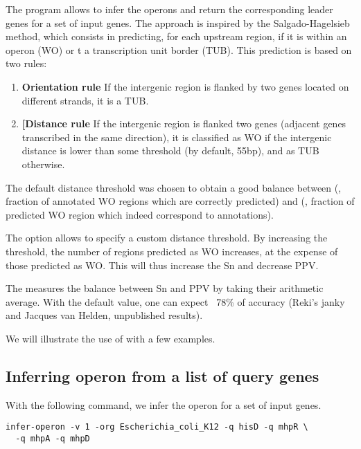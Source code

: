 The program  allows to infer the operons and
return the corresponding leader genes for a set of input genes.  The
approach is inspired by the Salgado-Hagelsieb method, which consists
in predicting, for each upstream region, if it is within an operon
(WO) or t a transcription unit border (TUB). This prediction is based
on two rules:

\begin{enumerate}
\item \textbf{Orientation rule} If the intergenic region is flanked by two
  genes located on different strands, it is a TUB.

\item \textbf{[Distance rule} If the intergenic region is flanked two
   genes (adjacent genes transcribed in the same
  direction), it is classified as WO if the intergenic distance is
  lower than some threshold (by default, 55bp), and as TUB otherwise.
\end{enumerate}

The default distance threshold was chosen to obtain a good balance
between  (, fraction of annotated WO
regions which are correctly predicted) and  (, fraction of predicted WO region
which indeed correspond to annotations).

The option  allows to specify a custom distance
threshold. By increasing the threshold, the number of regions
predicted as WO increases, at the expense of those predicted as
WO. This will thus increase the Sn and decrease PPV.

The  measures the balance between Sn and PPV by
taking their arithmetic average. With the default value, one can
expect ~78\% of accuracy (Reki's janky and Jacques van Helden,
unpublished results).

We will illustrate the use of  with a few
examples.
    
\subsection{Inferring operon from a list of query genes}

With the following command, we infer the operon for a set of input
genes.

{\color{Blue} \begin{footnotesize}
\begin{verbatim}
infer-operon -v 1 -org Escherichia_coli_K12 -q hisD -q mhpR \
  -q mhpA -q mhpD
\end{verbatim} \end{footnotesize}
}

